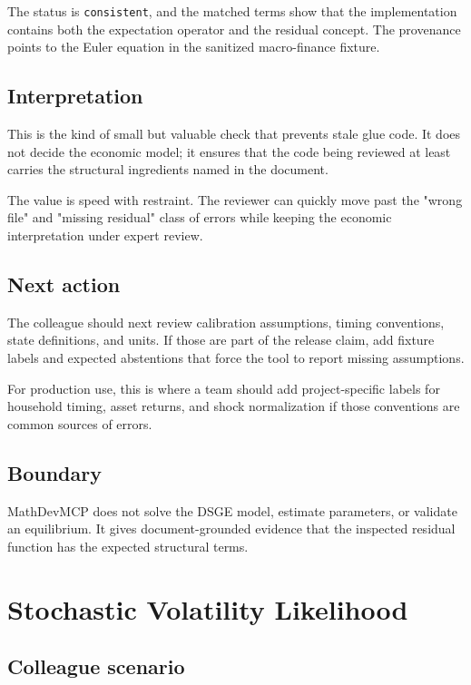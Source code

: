 \documentclass[12pt,a4paper,openany]{book}
\begin{document}
The status is \texttt{consistent}, and the matched terms show that the implementation
contains both the expectation operator and the residual concept. The provenance
points to the Euler equation in the sanitized macro-finance fixture.

\section*{Interpretation}

This is the kind of small but valuable check that prevents stale glue code. It
does not decide the economic model; it ensures that the code being reviewed at
least carries the structural ingredients named in the document.

The value is speed with restraint. The reviewer can quickly move past the
"wrong file" and "missing residual" class of errors while keeping the economic
interpretation under expert review.

\section*{Next action}

The colleague should next review calibration assumptions, timing conventions,
state definitions, and units. If those are part of the release claim, add
fixture labels and expected abstentions that force the tool to report missing
assumptions.

For production use, this is where a team should add project-specific labels for
household timing, asset returns, and shock normalization if those conventions
are common sources of errors.

\section*{Boundary}

MathDevMCP does not solve the DSGE model, estimate parameters, or validate an
equilibrium. It gives document-grounded evidence that the inspected residual
function has the expected structural terms.

\chapter{Stochastic Volatility Likelihood}

\section*{Colleague scenario}
\end{document}
